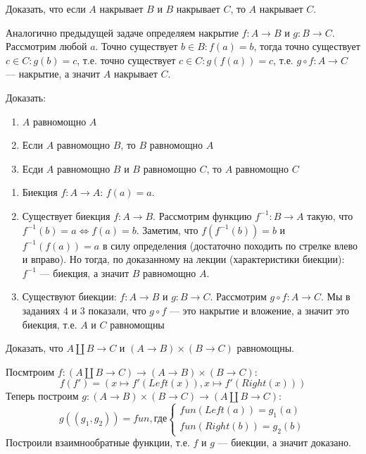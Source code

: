 \begin{task}[4]
Доказать, что если $A$ накрывает $B$ и $B$ накрывает $C$, то $A$ накрывает $C$.
\end{task}
\begin{solution}
Аналогично предыдущей задаче определяем накрытие $f: A \rightarrow B$ и $g: B \rightarrow C$.
Рассмотрим любой $a$. Точно существует $b \in B: f(a) = b$, тогда точно существует $c \in C: g(b) = c$, т.е. точно существует $c \in C: g(f(a)) = c$, т.е. $g \circ f: A \rightarrow C$ --- накрытие, а значит $A$ накрывает $C$. \xqed
\end{solution}
\newpage
\begin{task}[5]
Доказать:
\begin{enumerate}[label=(\alph*)]
	\item $A$ равномощно $A$
	\item Если $A$ равномощно $B$, то $B$ равномощно $A$
	\item Есди $A$ равномощно $B$ и $B$ равномощно $C$, то $A$ равномощно $C$
\end{enumerate}
\end{task}
\begin{solution}
\begin{enumerate}[label=(\alph*)]
	\item Биекция $f:A \rightarrow A$: $f(a) = a$. \xqed
	\item Существует биекция $f: A \rightarrow B$. Рассмотрим функцию $f^{-1}: B \rightarrow A$ такую, что $f^{-1}(b) = a \iff f(a) = b$. Заметим, что $f(f^{-1}(b)) = b$ и $f^{-1}(f(a)) = a$ в силу определения (достаточно походить по стрелке влево и вправо). Но тогда, по доказанному на лекции (характеристики биекции): $f^{-1}$ --- биекция, а значит $B$ равномощно $A$. \xqed
	\item Существуют биекции: $f: A \rightarrow B$ и $g: B \rightarrow C$. Рассмотрим $g\circ f: A \rightarrow C$. Мы в заданиях $4$ и $3$ показали, что $g\circ f$ --- это накрытие и вложение, а значит это биекция, т.е. $A$ и $C$ равномощны \xqed
\end{enumerate}
\end{solution}

\begin{task}[6]
Доказать, что $A \amalg B \rightarrow C$ и $(A \rightarrow B) \times (B \rightarrow C)$ равномощны. 
\end{task}
\begin{solution} 
Посмтроим $f : (A \amalg B \rightarrow C) \rightarrow (A \rightarrow B) \times (B \rightarrow C) $:
\[
	f(f') = (x \mapsto f'(Left(x)), x \mapsto f'(Right(x)))
\]
Теперь построим $g : (A \rightarrow B) \times (B \rightarrow C) \rightarrow (A \amalg B \rightarrow C)$:
\[
g((g_1, g_2)) = fun, \text{где} 
\begin{cases}
	fun(Left(a)) = g_1(a)\\
	fun(Right(b)) = g_2(b) 
\end{cases}
\]
Построили взаимнообратные функции, т.е. $f$ и $g$ --- биекции, а значит доказано. \xqed
\end{solution}

